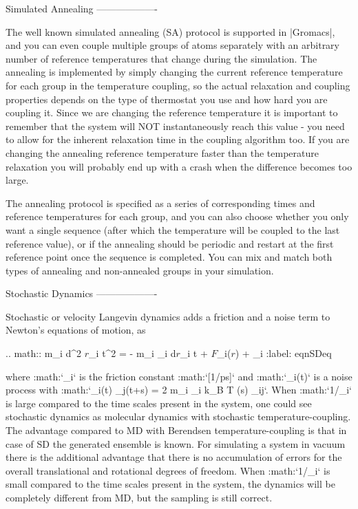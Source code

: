 Simulated Annealing
-------------------

The well known simulated
annealing
(SA) protocol is supported in |Gromacs|, and you can even couple multiple
groups of atoms separately with an arbitrary number of reference
temperatures that change during the simulation. The annealing is
implemented by simply changing the current reference temperature for
each group in the temperature coupling, so the actual relaxation and
coupling properties depends on the type of thermostat you use and how
hard you are coupling it. Since we are changing the reference
temperature it is important to remember that the system will NOT
instantaneously reach this value - you need to allow for the inherent
relaxation time in the coupling algorithm too. If you are changing the
annealing reference temperature faster than the temperature relaxation
you will probably end up with a crash when the difference becomes too
large.

The annealing protocol is specified as a series of corresponding times
and reference temperatures for each group, and you can also choose
whether you only want a single sequence (after which the temperature
will be coupled to the last reference value), or if the annealing should
be periodic and restart at the first reference point once the sequence
is completed. You can mix and match both types of annealing and
non-annealed groups in your simulation.

Stochastic Dynamics
-------------------

Stochastic or velocity Langevin
dynamics
adds a friction and a noise term to Newton’s equations of motion, as

.. math::  m_i {{\mbox{d}}^2 {\mbox{\boldmath ${r}$}}_i t^2} =
           - m_i \gamma_i {{\mbox{d}}{\mbox{\boldmath ${r}$}}_i t} + {\mbox{\boldmath ${F}$}}_i({\mbox{\boldmath ${r}$}}) + {}_i
           :label: eqnSDeq

where :math:`\gamma_i` is the friction constant :math:`[1/\mbox{ps}]`
and :math:`{}_i\!\!(t)` is a
noise process with
:math:`_i\!\!(t) {}_j\!\!(t+s) \rangle = 2 m_i \gamma_i k_B T \delta(s) \delta_{ij}`. When :math:`1/\gamma_i`
is large compared to the time scales present in the system, one could
see stochastic dynamics as molecular dynamics with stochastic
temperature-coupling. The advantage compared to MD with Berendsen
temperature-coupling is that in case of SD the generated ensemble is
known. For simulating a system in vacuum there is the additional
advantage that there is no accumulation of errors for the overall
translational and rotational degrees of freedom. When :math:`1/\gamma_i`
is small compared to the time scales present in the system, the dynamics
will be completely different from MD, but the sampling is still correct.

